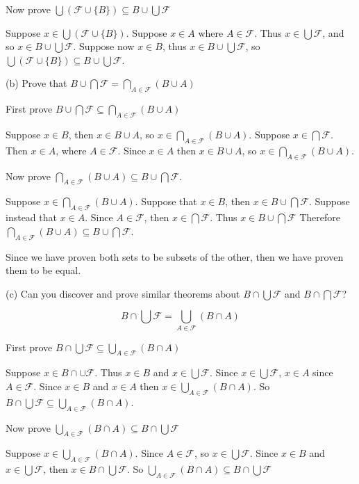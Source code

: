 \documentclass[11pt]{article}
\newcommand{\family}[1]{\mathcal{#1}}
\begin{document}
Now prove $\bigcup (\family{F} \cup \{B\}) \subseteq B \cup \bigcup \family{F}$

Suppose $x \in \bigcup (\family{F} \cup \{B\})$. Suppose $x \in A$ where $A \in \family{F}$.
Thus $x \in \bigcup \family{F}$, and so $x \in B \cup \bigcup \family{F}$. Suppose 
now $x \in B$, thus $x \in B \cup \bigcup \family{F}$, so 
$\bigcup (\family{F} \cup \{B\}) \subseteq B \cup \bigcup \family{F}$.

\noindent (b) Prove that $B \cup \bigcap \family{F} = \bigcap_{A \in \family{F}} (B \cup A)$

First prove $B \cup \bigcap \family{F} \subseteq \bigcap_{A \in \family{F}} (B \cup A)$

Suppose $x \in B$, then $x \in B \cup A$, so $x \in \bigcap_{A \in \family{F}} (B \cup A)$.
Suppose $x \in \bigcap \family{F}$. Then $x \in A$, where $A \in \family{F}$.
Since $x \in A$ then $x \in B \cup A$, so $x \in \bigcap_{A \in \family{F}} (B \cup A)$.

Now prove $\bigcap_{A \in \family{F}} (B \cup A) \subseteq B \cup \bigcap \family{F}$.

Suppose $x \in \bigcap_{A \in \family{F}} (B \cup A)$. Suppose that $x \in B$,
then $x \in B \cup \bigcap \family{F}$. Suppose instead that $x \in A$. Since 
$A \in \family{F}$, then $x \in \bigcap \family{F}$. Thus $x \in B \cup \bigcap \family{F}$
Therefore $\bigcap_{A \in \family{F}} (B \cup A) \subseteq B \cup \bigcap \family{F}$.

Since we have proven both sets to be subsets of the other, then we have proven 
them to be equal.

\noindent (c) Can you discover and prove similar theorems about 
$B \cap \bigcup \family{F}$ and $B \cap \bigcap \family{F}$?

$$B \cap \bigcup \family{F} = \bigcup_{A \in \family{F}} (B \cap A)$$

First prove $B \cap \bigcup \family{F} \subseteq \bigcup_{A \in \family{F}} (B \cap A)$

Suppose $x \in B \cap \cup \family{F}$. Thus $x \in B$ and $x \in \bigcup \family{F}$.
Since $x \in \bigcup \family{F}$, $x \in A$ since $A \in \family{F}$. Since 
$x \in B$ and $x \in A$ then $x \in \bigcup_{A \in \family{F}} (B \cap A)$. So 
$B \cap \bigcup \family{F} \subseteq \bigcup_{A \in \family{F}} (B \cap A)$.

Now prove $\bigcup_{A \in \family{F}} (B \cap A) \subseteq B \cap \bigcup \family{F}$

Suppose $x \in \bigcup_{A \in \family{F}} (B \cap A)$. Since $A \in \family{F}$,
so $x \in \bigcup \family{F}$. Since $x \in B$ and $x \in \bigcup \family{F}$,
then $x \in B \cap \bigcup \family{F}$. So 
$\bigcup_{A \in \family{F}} (B \cap A) \subseteq B \cap \bigcup \family{F}$
\end{document}
